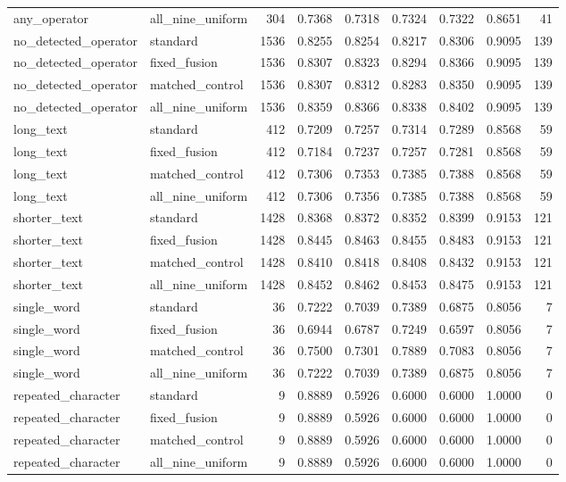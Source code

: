 \begin{tabular}{llrrrrrrr}
any\_operator & all\_nine\_uniform & 304 & 0.7368 & 0.7318 & 0.7324 & 0.7322 & 0.8651 & 41 \\
no\_detected\_operator & standard & 1536 & 0.8255 & 0.8254 & 0.8217 & 0.8306 & 0.9095 & 139 \\
no\_detected\_operator & fixed\_fusion & 1536 & 0.8307 & 0.8323 & 0.8294 & 0.8366 & 0.9095 & 139 \\
no\_detected\_operator & matched\_control & 1536 & 0.8307 & 0.8312 & 0.8283 & 0.8350 & 0.9095 & 139 \\
no\_detected\_operator & all\_nine\_uniform & 1536 & 0.8359 & 0.8366 & 0.8338 & 0.8402 & 0.9095 & 139 \\
long\_text & standard & 412 & 0.7209 & 0.7257 & 0.7314 & 0.7289 & 0.8568 & 59 \\
long\_text & fixed\_fusion & 412 & 0.7184 & 0.7237 & 0.7257 & 0.7281 & 0.8568 & 59 \\
long\_text & matched\_control & 412 & 0.7306 & 0.7353 & 0.7385 & 0.7388 & 0.8568 & 59 \\
long\_text & all\_nine\_uniform & 412 & 0.7306 & 0.7356 & 0.7385 & 0.7388 & 0.8568 & 59 \\
shorter\_text & standard & 1428 & 0.8368 & 0.8372 & 0.8352 & 0.8399 & 0.9153 & 121 \\
shorter\_text & fixed\_fusion & 1428 & 0.8445 & 0.8463 & 0.8455 & 0.8483 & 0.9153 & 121 \\
shorter\_text & matched\_control & 1428 & 0.8410 & 0.8418 & 0.8408 & 0.8432 & 0.9153 & 121 \\
shorter\_text & all\_nine\_uniform & 1428 & 0.8452 & 0.8462 & 0.8453 & 0.8475 & 0.9153 & 121 \\
single\_word & standard & 36 & 0.7222 & 0.7039 & 0.7389 & 0.6875 & 0.8056 & 7 \\
single\_word & fixed\_fusion & 36 & 0.6944 & 0.6787 & 0.7249 & 0.6597 & 0.8056 & 7 \\
single\_word & matched\_control & 36 & 0.7500 & 0.7301 & 0.7889 & 0.7083 & 0.8056 & 7 \\
single\_word & all\_nine\_uniform & 36 & 0.7222 & 0.7039 & 0.7389 & 0.6875 & 0.8056 & 7 \\
repeated\_character & standard & 9 & 0.8889 & 0.5926 & 0.6000 & 0.6000 & 1.0000 & 0 \\
repeated\_character & fixed\_fusion & 9 & 0.8889 & 0.5926 & 0.6000 & 0.6000 & 1.0000 & 0 \\
repeated\_character & matched\_control & 9 & 0.8889 & 0.5926 & 0.6000 & 0.6000 & 1.0000 & 0 \\
repeated\_character & all\_nine\_uniform & 9 & 0.8889 & 0.5926 & 0.6000 & 0.6000 & 1.0000 & 0 \\
\bottomrule
\end{tabular}
